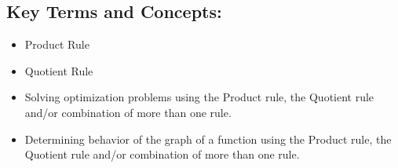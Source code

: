 \begin{framed}
\subsection*{Key Terms and Concepts:} 

\begin{itemize}
    \item Product Rule
    \item Quotient Rule
    \item Solving optimization problems using the Product rule, the Quotient rule and/or combination of more than one rule.
    \item Determining behavior of the graph of a function using the Product rule, the Quotient rule and/or combination of more than one rule.
\end{itemize}
\end{framed}

